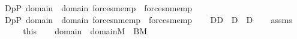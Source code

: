 \begin{isabellebody}
\ {\isacharquery}{\kern0pt}D{}{\isacharequal}{\kern0pt}{\isachardoublequoteopen}{\isacharbraceleft}{\kern0pt}p{\isasymin}P{\isachardot}{\kern0pt}\ {\isasymexists}{\isasymsigma}{\isasymin}domain{\isacharparenleft}{\kern0pt}{\isasymtau}{\isacharparenright}{\kern0pt}\ {\isasymunion}\ domain{\isacharparenleft}{\kern0pt}{\isasymtheta}{\isacharparenright}{\kern0pt}{\isachardot}{\kern0pt}\ forces{\isacharunderscore}{\kern0pt}mem{\isacharparenleft}{\kern0pt}p{\isacharcomma}{\kern0pt}{\isasymsigma}{\isacharcomma}{\kern0pt}{\isasymtau}{\isacharparenright}{\kern0pt}\ {\isasymand}\ forces{\isacharunderscore}{\kern0pt}nmem{\isacharparenleft}{\kern0pt}p{\isacharcomma}{\kern0pt}{\isasymsigma}{\isacharcomma}{\kern0pt}{\isasymtheta}{\isacharparenright}{\kern0pt}{\isacharbraceright}{\kern0pt}{\isachardoublequoteclose}\isanewline
\ \ \isamarkupfalse%
\ {\isacharquery}{\kern0pt}D{}{\isacharequal}{\kern0pt}{\isachardoublequoteopen}{\isacharbraceleft}{\kern0pt}p{\isasymin}P{\isachardot}{\kern0pt}\ {\isasymexists}{\isasymsigma}{\isasymin}domain{\isacharparenleft}{\kern0pt}{\isasymtau}{\isacharparenright}{\kern0pt}\ {\isasymunion}\ domain{\isacharparenleft}{\kern0pt}{\isasymtheta}{\isacharparenright}{\kern0pt}{\isachardot}{\kern0pt}\ forces{\isacharunderscore}{\kern0pt}nmem{\isacharparenleft}{\kern0pt}p{\isacharcomma}{\kern0pt}{\isasymsigma}{\isacharcomma}{\kern0pt}{\isasymtau}{\isacharparenright}{\kern0pt}\ {\isasymand}\ forces{\isacharunderscore}{\kern0pt}mem{\isacharparenleft}{\kern0pt}p{\isacharcomma}{\kern0pt}{\isasymsigma}{\isacharcomma}{\kern0pt}{\isasymtheta}{\isacharparenright}{\kern0pt}{\isacharbraceright}{\kern0pt}{\isachardoublequoteclose}\isanewline
\ \ \isamarkupfalse%
\ {\isacharquery}{\kern0pt}D{\isacharequal}{\kern0pt}{\isachardoublequoteopen}{\isacharquery}{\kern0pt}D{}\ {\isasymunion}\ {\isacharquery}{\kern0pt}D{}\ {\isasymunion}\ {\isacharquery}{\kern0pt}D{}{\isachardoublequoteclose}\isanewline
\ \ \isamarkupfalse%
\ assms\isanewline
\ \ \isamarkupfalse%
\ \isamarkupfalse%
\ this\isanewline
\ \ \isamarkupfalse%
\ {\isachardoublequoteopen}domain{\isacharparenleft}{\kern0pt}{\isasymtau}{\isacharparenright}{\kern0pt}\ {\isasymunion}\ domain{\isacharparenleft}{\kern0pt}{\isasymtheta}{\isacharparenright}{\kern0pt}{\isasymin}M{\isachardoublequoteclose}\ {\isacharparenleft}{\kern0pt}\ {\isachardoublequoteopen}{\isacharquery}{\kern0pt}B{\isasymin}M{\isachardoublequoteclose}{\isacharparenright}{\kern0pt}\ \isamarkupfalse%

\end{isabellebody}
